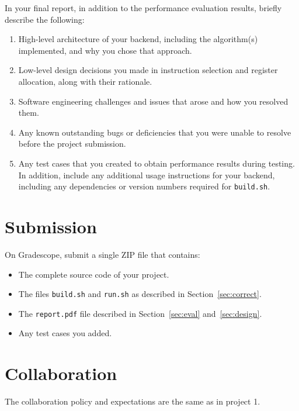 \documentclass[12pt]{article}
\begin{document}
In your final report, in addition to the performance evaluation results,
briefly describe the following:
%
\begin{enumerate}
\item High-level architecture of your backend, including the
  algorithm(s) implemented, and why you chose that approach.
\item Low-level design decisions you made in instruction selection and register allocation,
    along with their rationale.
\item Software engineering challenges and issues that arose and how
  you resolved them.
\item Any known outstanding bugs or deficiencies that you were unable
  to   resolve before the project submission.
\item Any test cases that you created to obtain performance results during testing. In addition, include any additional usage instructions for your backend, including any dependencies or version numbers required for \texttt{build.sh}.
 \end{enumerate}

\section{Submission}\label{sec:sub}

On Gradescope, submit a single ZIP file that contains:
\begin{itemize}
    \item The complete source code of your project.
    \item The files \texttt{build.sh} and \texttt{run.sh} as described in Section~\ref{sec:correct}.
    \item The \texttt{report.pdf} file described in Section~\ref{sec:eval} and~\ref{sec:design}.
    \item Any test cases you added.
\end{itemize}

\section{Collaboration}
%
The collaboration policy and expectations are the same as in project 1.
\end{document}
